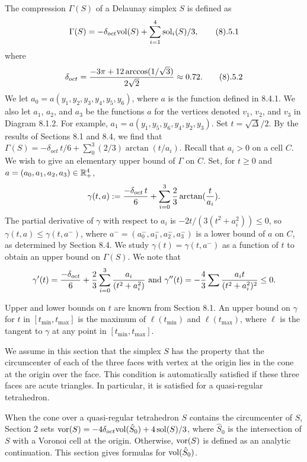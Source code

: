   The compression $\Gamma(S)$ of a Delaunay
simplex $S$ is defined as
$$\Gamma(S) = -\delta_{oct} \Vol(S) + \sum_{i=1}^4\sol_i(S)/3,\tag 8.5.1$$
where $$\delta_{oct} = {-3\pi + 12 \arccos(1/\sqrt{3})\over2\sqrt{2}} \approx
      0.72.\tag 8.5.2$$
We let $a_0=a(y_1,y_2,y_3,y_4,y_5,y_6)$, where $a$ is the function
defined in 8.4.1.  We also let $a_1$, $a_2$, and $a_3$
be the functions $a$ for the vertices denoted $v_1$, $v_2$, and $v_3$ 
in
Diagram 8.1.2.  For example, $a_1=a(y_1,y_5,y_6,y_4,y_2,y_3)$.
Set $t =  \sqrt{\Delta}/2$.
By the results of Sections 8.1 and 8.4, we find that
$\Gamma(S) = -\delta_{oct}\, t/6 +
\sum_0^3 (2/3)\arctan(t/a_i)$.
Recall that $a_i>0$ on a cell $C$.
  We wish to give an elementary upper bound of
$\Gamma$ on $C$.  Set, for $t\ge 0$ and $a=(a_0,a_1,a_2,a_3)\in {\Bbb R_+^4}$,
$$\gamma(t,a) := {-\delta_{oct}\, t\over 6} + \sum_{i=0}^3 {2\over 3}
\arctan({t\over a_i}).$$
The partial derivative of $\gamma$ with respect to $a_i$ is
$-2t/(3(t^2+a_i^2))\le0$, so $\gamma(t,a)\le \gamma(t,a^-)$, where
$a^-=(a_0^-,a_1^-,a_2^-,a_3^-)$
is a lower bound of $a$ on $C$, as   determined
by Section 8.4. 
We study $\gamma(t) = \gamma(t,a^-)$ as a function of $t$ to
obtain an upper bound on $\Gamma(S)$.
We note that
$$\gamma'(t) = {-\delta_{oct}\over 6} + {2\over 3} \sum_{i=0}^3
        {a_i\over (t^2+a_i^2)}\text{ and }
\gamma''(t) = -{4\over 3}\sum {a_i t\over (t^2+a_i^2)^2} \le 0.$$

Upper and lower bounds on $t$ are known from Section 8.1.
An upper bound on $\gamma$ for $t$ in
$[t_{\min},t_{\max}]$ is the maximum of $\ell(t_{\min})$
and $\ell(t_{\max})$, where $\ell$ is the tangent
to $\gamma$ at any point in $[t_{\min},t_{\max}]$.


\bigskip\hbox{}\bigskip
{}
\bigskip

We assume in this section that the simplex 
$S$ has the property that the
circumcenter of each of the three faces with vertex at the
origin lies in the cone at the origin over the face.  This condition is
automatically satisfied if these three faces are acute triangles.
In particular, it is satisfied for a quasi-regular tetrahedron.

When the cone over a
quasi-regular tetrahedron $S$ contains the circumcenter of $S$,
Section 2 sets $\operatorname{vor}(S) = -4\delta_{oct}\hbox{vol}(\hat S_0)
	+ 4\operatorname{sol}(S)/3$, where $\hat S_0$ is the intersection of $S$
with a Voronoi cell at the origin.  Otherwise,
$\operatorname{vor}(S)$ is defined as an analytic continuation.
This section gives formulas for $\hbox{vol}(\hat S_0)$.

